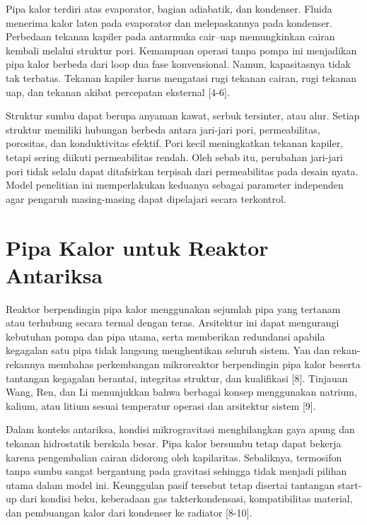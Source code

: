 \documentclass[
  12pt,a4paper,oneside]{report}
\begin{document}
Pipa kalor terdiri atas evaporator, bagian adiabatik, dan kondenser.
Fluida menerima kalor laten pada evaporator dan melepaskannya pada
kondenser. Perbedaan tekanan kapiler pada antarmuka cair--uap
memungkinkan cairan kembali melalui struktur pori. Kemampuan operasi
tanpa pompa ini menjadikan pipa kalor berbeda dari loop dua fase
konvensional. Namun, kapasitasnya tidak tak terbatas. Tekanan kapiler
harus mengatasi rugi tekanan cairan, rugi tekanan uap, dan tekanan
akibat percepatan eksternal {[}4-6{]}.

Struktur sumbu dapat berupa anyaman kawat, serbuk tersinter, atau alur.
Setiap struktur memiliki hubungan berbeda antara jari-jari pori,
permeabilitas, porositas, dan konduktivitas efektif. Pori kecil
meningkatkan tekanan kapiler, tetapi sering diikuti permeabilitas
rendah. Oleh sebab itu, perubahan jari-jari pori tidak selalu dapat
ditafsirkan terpisah dari permeabilitas pada desain nyata. Model
penelitian ini memperlakukan keduanya sebagai parameter independen agar
pengaruh masing-masing dapat dipelajari secara terkontrol.

\hypertarget{pipa-kalor-untuk-reaktor-antariksa}{%
\section{Pipa Kalor untuk Reaktor
Antariksa}\label{pipa-kalor-untuk-reaktor-antariksa}}

Reaktor berpendingin pipa kalor menggunakan sejumlah pipa yang tertanam
atau terhubung secara termal dengan teras. Arsitektur ini dapat
mengurangi kebutuhan pompa dan pipa utama, serta memberikan redundansi
apabila kegagalan satu pipa tidak langsung menghentikan seluruh sistem.
Yan dan rekan-rekannya membahas perkembangan mikroreaktor berpendingin
pipa kalor beserta tantangan kegagalan berantai, integritas struktur,
dan kualifikasi {[}8{]}. Tinjauan Wang, Ren, dan Li menunjukkan bahwa
berbagai konsep menggunakan natrium, kalium, atau litium sesuai
temperatur operasi dan arsitektur sistem {[}9{]}.

Dalam konteks antariksa, kondisi mikrogravitasi menghilangkan gaya apung
dan tekanan hidrostatik berskala besar. Pipa kalor bersumbu tetap dapat
bekerja karena pengembalian cairan didorong oleh kapilaritas.
Sebaliknya, termosifon tanpa sumbu sangat bergantung pada gravitasi
sehingga tidak menjadi pilihan utama dalam model ini. Keunggulan pasif
tersebut tetap disertai tantangan start-up dari kondisi beku, keberadaan
gas takterkondensasi, kompatibilitas material, dan pembuangan kalor dari
kondenser ke radiator {[}8-10{]}.
\end{document}
